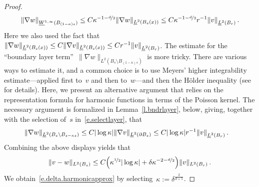 \documentclass[11pt,twoside]{article} %
\numberwithin{equation}{section}
\theoremstyle{definition}
\let\originalleft\left
\let\originalright\right
\renewcommand{\left}{\mathopen{}\mathclose\bgroup\originalleft}
\renewcommand{\right}{\aftergroup\egroup\originalright}
\begin{document}
\begin{proof}
\begin{equation*}
\left\| \nabla w \right\|_{\underline{W}^{1,\infty}(B_{(1-\kappa) s})}
\leq
C \kappa^{-1-\nicefrac d2} \| \nabla w \|_{\underline{L}^2(B_s(x))} \leq C \kappa^{-1-\nicefrac d2} r^{-1} \left\| v \right\|_{\underline{L}^2(B_{r})} \,.
\end{equation*}
Here we also used the fact that~$\| \nabla w \|_{\underline{L}^2(B_s(x))}  \leq C \| \nabla v \|_{\underline{L}^2(B_s(x))} \leq C r^{-1} \left\| v \right\|_{\underline{L}^2(B_{r})}$. The estimate for the ``boundary layer term''~$\| \nabla w \|_{L^2 (B_{s} \setminus B_{(1-\kappa)s})}$ is more tricky. There are various ways to estimate it, and a common choice is to use Meyers' higher integrability estimate---applied first to~$v$ and then to~$w$---and then the H\"older inequality (see~\cite{AKMBook} for details). Here, we present an alternative argument that relies on the representation formula for harmonic functions in terms of the Poisson kernel. The necessary argument is formalized in Lemma~\ref{l.bndrlayer}, below, giving, together with the selection of~$s$ in~\eqref{e.selectlayer}, that
\begin{align*}  
\| \nabla w \|_{\underline{L}^2 (B_{s} \setminus B_{s-\kappa s})} 
& 
\leq
C  |\log \kappa|   \| \nabla v \|_{\underline{L}^2(\partial B_{s})}  \leq C |\log \kappa| r^{-1} \left\| v \right\|_{\underline{L}^2(B_{r})}
\,.
\end{align*}
Combining the above displays yields that
\begin{align*}  
\| v - w \|_{L^2(B_s)}  
\leq 
C \Bigl( \kappa^{\nicefrac12} |\log \kappa |
+ \delta \kappa^{-2-\nicefrac d2} \Bigr)  \| v  \|_{L^2(B_r)}
\,.
\end{align*}
We obtain~\eqref{e.delta.harmonicapprox} by selecting~$\kappa := \delta^{\frac{2}{d+5}}$. 

\smallskip



\end{proof}
\end{document}
